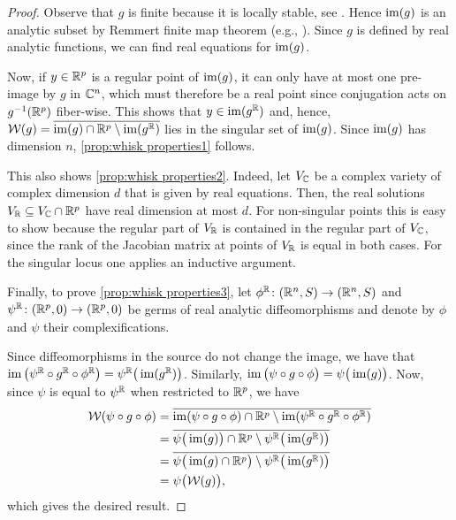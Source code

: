 \documentclass[a4paper,12pt]{amsart}
\begin{document}
\begin{proof}
Observe that $g$ is finite because it is locally stable, see \cite[Proposition 7.1 and Remark 7.1]{Mond2020}. Hence $\operatorname{im}(g)$ is an analytic subset by Remmert finite map theorem (e.g., \cite[Corollary 1.68]{Greuel2007}). Since $g$ is defined by real analytic functions, we can find  real equations for $\operatorname{im}(g)$. 

Now, if $y\in\mathbb{R}^p$ is a regular point of $\operatorname{im}(g)$, it can only have at most one pre-image by $g$ in $\mathbb{C}^n$, which must therefore be a real point since conjugation acts on $g^{-1}(\mathbb{R}^p)$ fiber-wise. This shows that $y\in\operatorname{im}(g^{\mathbb{R}})$ and, hence, $\mathcal{W}(g)=\overline{\operatorname{im}(g)\cap\mathbb{R}^p\setminus \operatorname{im}(g^{\mathbb{R}})}$ lies in the singular set of $\operatorname{im}(g)$. Since $\operatorname{im}(g)$ has dimension $n$, \cref{prop:whisk properties1} follows.

This also shows \cref{prop:whisk properties2}. Indeed, let $V_{\mathbb{C}}$ be a complex variety of complex dimension $d$ that is given by real equations. Then, the real solutions $V_{\mathbb{R}}\subseteq V_{\mathbb{C}}\cap\mathbb{R}^p$ have real dimension at most $d$. For non-singular points this is easy to show because the regular part of $V_{\mathbb{R}}$ is contained in the regular part of $V_{\mathbb{C}}$, since the rank of the Jacobian matrix at points of $V_{\mathbb{R}}$ is equal in both cases. For the singular locus one applies an inductive argument.

Finally, to prove \cref{prop:whisk properties3}, let $\phi^{\mathbb{R}}\colon(\mathbb{R}^n,S)\to(\mathbb{R}^n,S)$ and $\psi^{\mathbb{R}}\colon(\mathbb{R}^p,0)\to(\mathbb{R}^p,0)$ be germs of real analytic diffeomorphisms and denote by $\phi$ and $\psi$ their complexifications.

Since diffeomorphisms in the source do not change the image, we have that $\operatorname{im}\big(\psi^{\mathbb{R}}\circ g^{\mathbb{R}}\circ \phi^{\mathbb{R}}\big) = \psi^{\mathbb{R}}\big(\operatorname{im}(g^{\mathbb{R}})\big)$.
Similarly, $\operatorname{im}\big(\psi\circ g \circ \phi\big) = \psi\big(\operatorname{im}(g)\big)$.
Now, since $\psi$ is equal to $\psi^{\mathbb{R}}$ when restricted to $\mathbb{R}^p$, we have
\begin{equation*}
\begin{aligned}
\mathcal{W}(\psi\circ g\circ \phi) &= \overline{\operatorname{im}(\psi\circ g\circ \phi)\cap \mathbb{R}^p \setminus \operatorname{im}(\psi^{\mathbb{R}}\circ g^{\mathbb{R}}\circ\phi^{\mathbb{R}})} \\
& = \overline{\psi\big(\operatorname{im}(g)\big)\cap \mathbb{R}^p \setminus \psi^{\mathbb{R}}\big(\operatorname{im}(g^{\mathbb{R}})\big)}\\
& = \overline{\psi\big(\operatorname{im}(g)\cap \mathbb{R}^p\big) \setminus \psi^{\mathbb{R}}\big(\operatorname{im}(g^{\mathbb{R}})\big)}\\
& = \psi\big(\mathcal{W}(g)\big),
\end{aligned}
\end{equation*}
which gives the desired result.
\end{proof}
\end{document}
